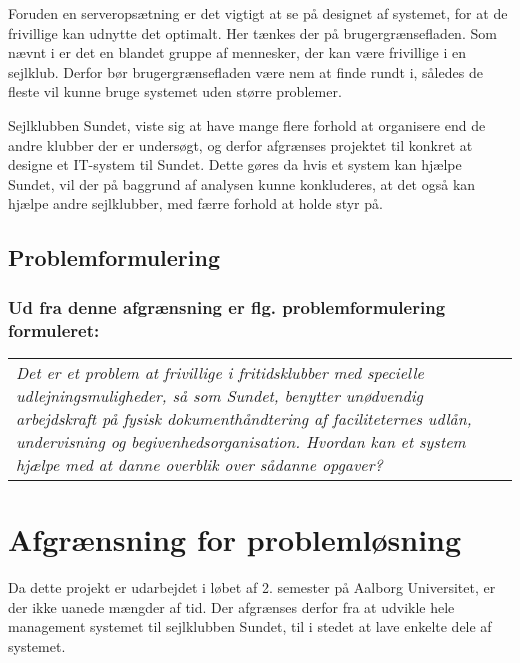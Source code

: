 Foruden en serveropsætning er det vigtigt at se på designet af systemet, for at de frivillige kan udnytte det
optimalt. 
Her tænkes der på brugergrænsefladen. 
Som nævnt i  er det en blandet gruppe af mennesker, der kan være frivillige i en sejlklub. 
Derfor bør brugergrænsefladen være nem at finde rundt i, således de fleste vil kunne bruge systemet uden større problemer. 

Sejlklubben Sundet, viste sig at have mange flere forhold at organisere end de andre klubber der er undersøgt, og
derfor afgrænses projektet til konkret at designe et IT-system til Sundet. Dette gøres da hvis et system kan
hjælpe Sundet, vil der på baggrund af analysen kunne konkluderes, at det også kan hjælpe andre sejlklubber,
med færre forhold at holde styr på.

\subsection*{Problemformulering}
\subsubsection*{Ud fra denne afgrænsning er flg. problemformulering formuleret:}

\begin{center}
  \begin{tabular}{|p{14cm}|}
    \textit{Det er et problem at frivillige i fritidsklubber med specielle udlejningsmuligheder, så som Sundet, benytter unødvendig arbejdskraft på fysisk dokumenthåndtering af faciliteternes udlån, undervisning og begivenhedsorganisation. Hvordan kan et system hjælpe med at danne overblik over sådanne opgaver?}
  \end{tabular}
\end{center}


\section{Afgrænsning for problemløsning}

Da dette projekt er udarbejdet i løbet af 2. semester på Aalborg Universitet, er der ikke uanede mængder af tid. Der afgrænses derfor fra at udvikle hele management systemet til sejlklubben Sundet, til i stedet at lave enkelte dele af systemet.

